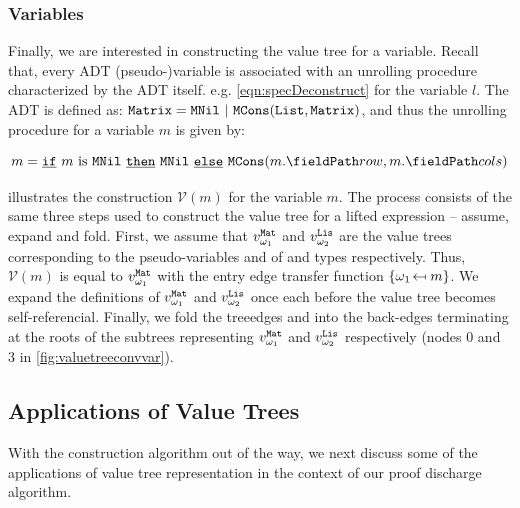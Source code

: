 \subsubsection{Variables}
Finally, we are interested in constructing the value tree for a variable.
Recall that, every ADT (pseudo-)variable is associated with an unrolling procedure
characterized by the ADT itself. e.g. \cref{eqn:specDeconstruct}
for the  variable $l$.
The  ADT is defined as:
${\tt Matrix} = {\tt MNil} \ | \ {\tt MCons}({\tt List},{\tt Matrix})$,
and thus the unrolling procedure for a  variable $m$ is given by:

\begin{equation}
\label{matrixunrollingprocedure}
m = \sumIf{\sumIs{m}{MNil}} \  \sumThen{\cons{MNil}} \  \sumElse{\cons{MCons}(\prodAccess{m}{row}, \prodAccess{m}{cols})}
\end{equation}

 illustrates the construction $\mathcal{V}(m)$ for the  variable $m$.
The process consists of the same three steps used to construct the value tree
for a lifted expression -- assume, expand and fold.
First, we assume that $v_{\omega_{1}\!}^{\tt Mat}$ and $v_{\omega_{2}\!}^{\tt Lis}$ are the value trees
corresponding to the pseudo-variables  and  of  and 
types respectively.
Thus, $\mathcal{V}(m)$ is equal to $v_{\omega_{1}\!}^{\tt Mat}$ with the entry edge transfer function
$\{ {\omega_{1}\!} \mapsfrom m \}$.
We expand the definitions of $v_{\omega_{1}\!}^{\tt Mat}$ and $v_{\omega_{2}\!}^{\tt Lis}$ once each before
the value tree becomes self-referencial.
Finally, we fold the treeedges  and  into the back-edges
terminating at the roots of the subtrees representing $v_{\omega_{1}\!}^{\tt Mat}$ and $v_{\omega_{2}\!}^{\tt Lis}$
respectively (nodes 0 and 3 in \cref{fig:valuetreeconvvar}).

\subsection{Applications of Value Trees}
\label{sec:valuetreeapps}
With the construction algorithm out of the way, we next discuss some of the applications of value tree representation
in the context of our proof discharge algorithm.


